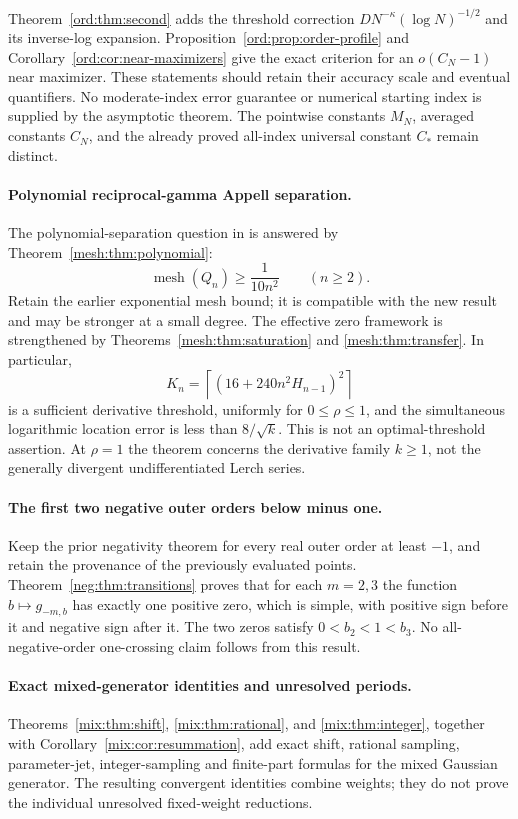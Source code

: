 Theorem~\ref{ord:thm:second} adds the threshold correction
$DN^{-\kappa}(\log N)^{-1/2}$ and its inverse-log expansion.
Proposition~\ref{ord:prop:order-profile} and
Corollary~\ref{ord:cor:near-maximizers} give the exact criterion for an
$o(C_N-1)$ near maximizer. These statements should retain their accuracy
scale and eventual quantifiers. No moderate-index error guarantee or
numerical starting index is supplied by the asymptotic theorem.
The pointwise constants $M_N$, averaged constants $C_N$, and the already
proved all-index universal constant $C_*$ remain distinct.

\paragraph{Polynomial reciprocal-gamma Appell separation.}
The polynomial-separation question in
\cite[Sections 4 and 8]{IncomingUniform} is answered by
Theorem~\ref{mesh:thm:polynomial}:
\[
 \operatorname{mesh}(Q_n)\ge\frac1{10n^2}\qquad(n\ge2).
\]
Retain the earlier exponential mesh bound; it is compatible with the
new result and may be stronger at a small degree. The effective zero
framework is strengthened by Theorems~\ref{mesh:thm:saturation} and
\ref{mesh:thm:transfer}. In particular,
\[
 K_n=\left\lceil(16+240n^2H_{n-1})^2\right\rceil
\]
is a sufficient derivative threshold, uniformly for $0\le\rho\le1$,
and the simultaneous logarithmic location error is less than
$8/\sqrt k$. This is not an optimal-threshold assertion. At $\rho=1$
the theorem concerns the derivative family $k\ge1$, not the generally
divergent undifferentiated Lerch series.

\paragraph{The first two negative outer orders below minus one.}
Keep the prior negativity theorem for every real outer order at least
$-1$, and retain the provenance of the previously evaluated points.
Theorem~\ref{neg:thm:transitions} proves that for each $m=2,3$ the
function $b\mapsto g_{-m,b}$ has exactly one positive zero, which is
simple, with positive sign before it and negative sign after it.
The two zeros satisfy $0<b_2<1<b_3$. No all-negative-order one-crossing
claim follows from this result.

\paragraph{Exact mixed-generator identities and unresolved periods.}
Theorems~\ref{mix:thm:shift}, \ref{mix:thm:rational}, and
\ref{mix:thm:integer}, together with
Corollary~\ref{mix:cor:resummation}, add exact shift, rational sampling,
parameter-jet, integer-sampling and finite-part formulas for the mixed
Gaussian generator. The resulting convergent identities combine weights;
they do not prove the individual unresolved fixed-weight reductions.

